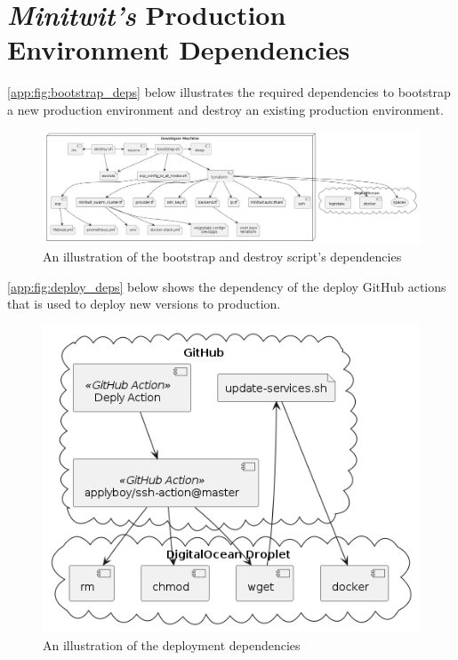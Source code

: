 \section{\textit{Minitwit's} Production Environment Dependencies}
\label{app:prod-deps}

\autoref{app:fig:bootstrap_deps} below illustrates the required dependencies to bootstrap a new production environment and destroy an existing production environment.

\begin{figure}[H]
    \centering
    \includegraphics[width=\textwidth]{images/deps/bootstrap-deps.png}
    \caption{An illustration of the bootstrap and destroy script's dependencies}
    \label{app:fig:bootstrap_deps}
\end{figure}

\autoref{app:fig:deploy_deps} below shows the dependency of the deploy GitHub actions that is used to deploy new versions to production.

\begin{figure}[H]
    \centering
    \includegraphics[width=\textwidth]{images/deps/do-deps.png}
    \caption{An illustration of the deployment dependencies}
    \label{app:fig:deploy_deps}
\end{figure}

